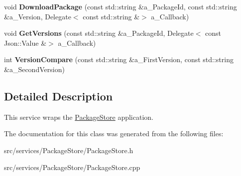 \begin{DoxyCompactItemize}
\item 
\mbox{\label{class_package_store_ada150ea0e76c4c89193c4daffcd811cd}} 
void {\bfseries Download\+Package} (const std\+::string \&a\+\_\+\+Package\+Id, const std\+::string \&a\+\_\+\+Version, Delegate$<$ const std\+::string \&$>$ a\+\_\+\+Callback)
\item 
\mbox{\label{class_package_store_a60b09b7b3b424db6f7b1c3c30af5a186}} 
void {\bfseries Get\+Versions} (const std\+::string \&a\+\_\+\+Package\+Id, Delegate$<$ const Json\+::\+Value \&$>$ a\+\_\+\+Callback)
\item 
\mbox{\label{class_package_store_a10bb954fb5040259ad830f4d483bd026}} 
int {\bfseries Version\+Compare} (const std\+::string \&a\+\_\+\+First\+Version, const std\+::string \&a\+\_\+\+Second\+Version)
\end{DoxyCompactItemize}


\subsection{Detailed Description}
This service wraps the \hyperlink{class_package_store}{Package\+Store} application. 

The documentation for this class was generated from the following files\+:\begin{DoxyCompactItemize}
\item 
src/services/\+Package\+Store/Package\+Store.\+h\item 
src/services/\+Package\+Store/Package\+Store.\+cpp\end{DoxyCompactItemize}
